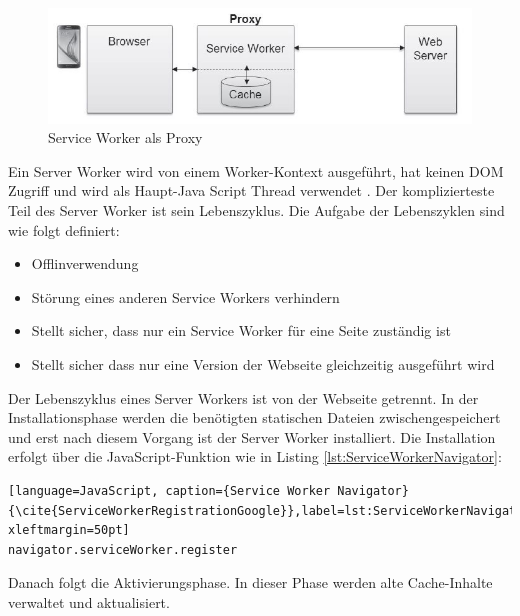 \begin{figure}[h]
	\centering
	\includegraphics[width=14cm]{BilderAllgemein/SWProxy}\medskip
	\caption{Service Worker als Proxy \cite{SWProxy}}
	\label{fig:SWProxy}
\end{figure}

Ein Server Worker wird von einem Worker-Kontext ausgeführt, hat keinen DOM Zugriff und wird als Haupt-Java Script Thread verwendet \cite{Worker} \cite{ServiceWorker}.
Der komplizierteste Teil des Server Worker ist sein Lebenszyklus. 
Die Aufgabe der Lebenszyklen sind wie folgt definiert:

\begin{itemize}
    \item  Offlinverwendung
	\item  Störung eines anderen Service Workers verhindern
	\item  Stellt sicher, dass nur ein Service Worker für eine Seite zuständig ist
	\item  Stellt sicher dass nur eine Version der Webseite gleichzeitig ausgeführt wird
\end{itemize}


Der Lebenszyklus eines Server Workers ist von der Webseite getrennt.
In der Installationsphase werden die benötigten statischen Dateien zwischengespeichert und erst nach diesem Vorgang ist der Server Worker installiert. Die Installation erfolgt über die JavaScript-Funktion wie in Listing \ref{lst:ServiceWorkerNavigator}:

\begin{lstlisting}[language=JavaScript, caption={Service Worker Navigator} {\cite{ServiceWorkerRegistrationGoogle}},label=lst:ServiceWorkerNavigator, xleftmargin=50pt]
navigator.serviceWorker.register
\end{lstlisting}

Danach folgt die Aktivierungsphase. In dieser Phase werden alte Cache-Inhalte verwaltet und aktualisiert.





